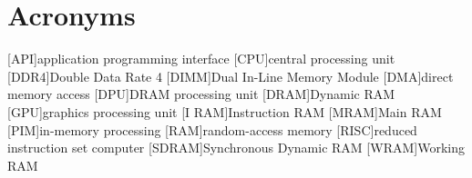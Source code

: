 \section{Acronyms}

\begin{acronym}
	[API]{application programming interface}
	[CPU]{central processing unit}
	[DDR4]{Double Data Rate 4}
	[DIMM]{Dual In-Line Memory Module}
	[DMA]{direct memory access}
	[DPU]{\acs*{DRAM} processing unit}
	[DRAM]{Dynamic \acs*{RAM}}
	[GPU]{graphics processing unit}
	[I\kern1pt RAM]{Instruction \acs*{RAM}}
	[MRAM]{Main \acs*{RAM}}
	[PIM]{in-memory processing}
	[RAM]{random-access memory}
	[RISC]{reduced instruction set computer}
	[SDRAM]{Synchronous Dynamic \acs*{RAM}}
	[WRAM]{Working \acs*{RAM}}
\end{acronym}
